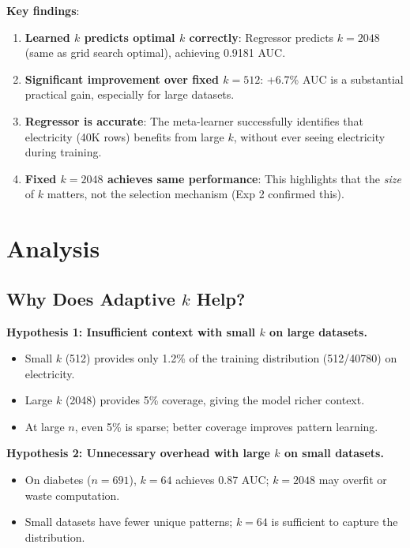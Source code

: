 \documentclass[11pt,a4paper]{article}
\begin{document}
\textbf{Key findings}:

\begin{enumerate}
\item \textbf{Learned $k$ predicts optimal $k$ correctly}: Regressor predicts $k=2048$ (same as grid search optimal), achieving 0.9181 AUC.

\item \textbf{Significant improvement over fixed $k=512$}: +6.7\% AUC is a substantial practical gain, especially for large datasets.

\item \textbf{Regressor is accurate}: The meta-learner successfully identifies that electricity (40K rows) benefits from large $k$, without ever seeing electricity during training.

\item \textbf{Fixed $k=2048$ achieves same performance}: This highlights that the \textit{size} of $k$ matters, not the selection mechanism (Exp 2 confirmed this).
\end{enumerate}

\section{Analysis}

\subsection{Why Does Adaptive $k$ Help?}

\textbf{Hypothesis 1: Insufficient context with small $k$ on large datasets.}
\begin{itemize}
\item Small $k$ (512) provides only 1.2\% of the training distribution (512/40780) on electricity.
\item Large $k$ (2048) provides 5\% coverage, giving the model richer context.
\item At large $n$, even 5\% is sparse; better coverage improves pattern learning.
\end{itemize}

\textbf{Hypothesis 2: Unnecessary overhead with large $k$ on small datasets.}
\begin{itemize}
\item On diabetes ($n=691$), $k=64$ achieves 0.87 AUC; $k=2048$ may overfit or waste computation.
\item Small datasets have fewer unique patterns; $k=64$ is sufficient to capture the distribution.
\end{itemize}
\end{document}
